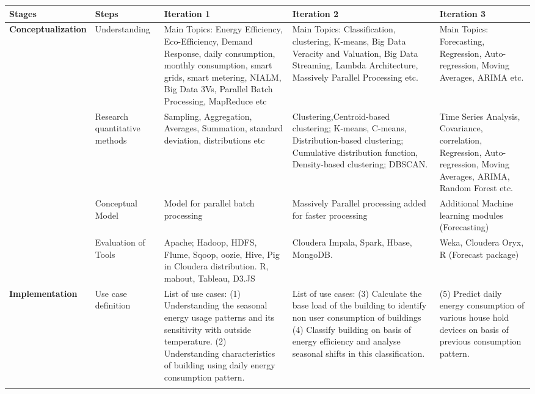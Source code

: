 \begin{table}\tiny %
\begin{tabular}{|m{2.2cm}|>{\raggedright}m{1.7cm}|>{\raggedright}m{3.4cm}|>{\raggedright}m{3.4cm}|m{3.4cm}|}
\hline
	\textbf{Stages} & \textbf{Steps} & \textbf{Iteration 1} & \textbf{Iteration 2} & \textbf{Iteration 3} \\ \hline
	\multirow{4}{*}{\textbf{Conceptualization}} & Understanding  & Main Topics: Energy Efficiency, Eco-Efficiency, Demand Response, daily consumption, monthly consumption, smart grids, smart metering, NIALM, Big Data 3Vs, Parallel Batch Processing, MapReduce etc & Main Topics: Classification, clustering, K-means, Big Data Veracity and Valuation, Big Data Streaming, Lambda Architecture, Massively Parallel Processing etc. & Main Topics: Forecasting, Regression, Auto-regression, Moving Averages, ARIMA etc. \\ \cline{2-5}
	 & Research quantitative methods
 & Sampling, Aggregation,  Averages, Summation, standard deviation, distributions etc & Clustering,Centroid-based clustering; K-means, C-means, Distribution-based clustering; Cumulative distribution function,  Density-based clustering; DBSCAN.  & Time Series Analysis, Covariance, correlation, Regression, Auto-regression, Moving Averages, ARIMA, Random Forest etc. \\  \cline{2-5}
	 & Conceptual Model & Model for parallel batch processing & Massively Parallel processing added for faster processing & Additional Machine learning modules (Forecasting) \\  \cline{2-5}
	 & Evaluation of Tools & Apache; Hadoop, HDFS, Flume, Sqoop, oozie, Hive, Pig in Cloudera distribution.
R, mahout, Tableau, D3.JS  & Cloudera Impala, Spark, Hbase, MongoDB. & Weka, Cloudera Oryx,  R (Forecast package) \\ \hline
\multirow{4}{*}{\textbf{Implementation}} & Use case definition
 & List of use cases:
(1) Understanding the seasonal energy usage patterns and its sensitivity with outside temperature.
(2) Understanding characteristics of building using daily energy consumption pattern. & List of use cases:
(3) Calculate the base load of the building to identify non user consumption of buildings
(4) Classify building on basis of energy efficiency and analyse seasonal shifts in this classification. & (5) Predict daily energy consumption of various house hold devices on basis of previous consumption pattern. \\ \cline{2-5}

\end{tabular}
\end{table}
